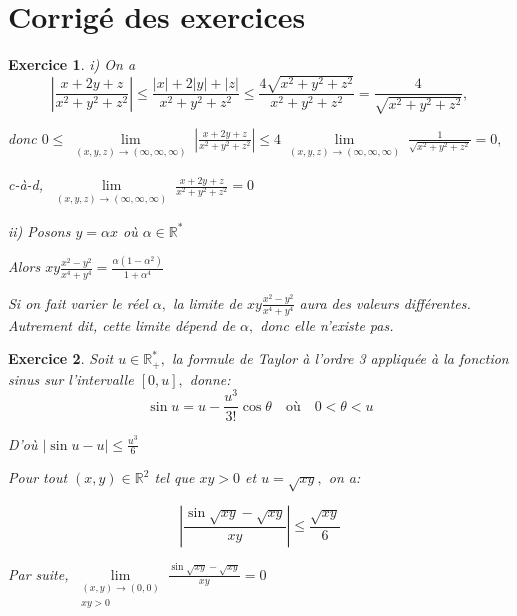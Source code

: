 \documentclass[11pt,a4paper]{report}
\newtheorem{exo}{Exercice}[section]
\begin{document}
\section{Corrigé des exercices}
\begin{exo}

i) On a
$$|\frac{x+2y+z}{x^2+y^2+z^2}|\leq\frac{|x|+2|y|+|z|}{x^2+y^2+z^2}\leq\frac{4\sqrt{x^2+y^2+z^2}}{x^2+y^2+z^2}=\frac{4}{\sqrt{x^2+y^2+z^2}},$$

donc $0\leq \lim\limits_{\substack{(x,y,z) \rightarrow (\infty,\infty,\infty)}}|\frac{x+2y+z}{x^2+y^2+z^2}|\leq 4\lim\limits_{\substack{(x,y,z) \rightarrow (\infty,\infty,\infty)}}\frac{1}{\sqrt{x^2+y^2+z^2}}=0,$

c-à-d, $\lim\limits_{\substack{(x,y,z) \rightarrow (\infty,\infty,\infty)}}\frac{x+2y+z}{x^2+y^2+z^2}=0$

ii) Posons $y=\alpha x$ où $\alpha\in \mathbb{R}^{*}$

Alors $xy\frac{x^2-y^2}{x^4+y^4}=\frac{\alpha(1-\alpha^2)}{1+\alpha^4}$

Si on fait varier le réel $\alpha,$ la limite de $xy\frac{x^2-y^2}{x^4+y^4}$ aura des valeurs différentes. Autrement dit, cette limite dépend de $\alpha,$ donc elle n'existe pas.
\end{exo}
\begin{exo}
Soit $u\in \mathbb{R}_{+}^{*},$ la formule de Taylor à l'ordre 3 appliquée à la fonction sinus sur l'intervalle $[0,u],$ donne:
$$\sin u=u-\frac{u^3}{3!}\cos\theta\quad\mbox{où}\quad 0<\theta<u$$

D'où $|\sin u-u|\leq \frac{u^3}{6}$

Pour tout $(x,y)\in \mathbb{R}^2$ tel que $xy>0$ et $u=\sqrt{xy},$ on a:

$$|\frac{\sin\sqrt{xy}-\sqrt{xy}}{xy}|\leq\frac{\sqrt{xy}}{6}$$

Par suite, $\lim\limits_{\substack{(x,y) \rightarrow (0,0)\\ xy>0}}\frac{\sin\sqrt{xy}-\sqrt{xy}}{xy}=0$
\end{exo}
\end{document}
